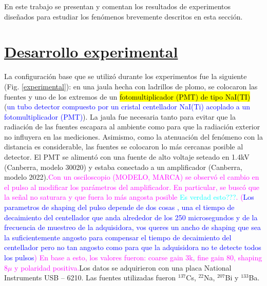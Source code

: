 \documentclass[twoside]{article}
\begin{document}
\begin{multicols}{2}
\fi

En este trabajo se presentan y comentan los resultados de experimentos diseñados para estudiar los fenómenos brevemente descritos en esta sección.


\section*{\underline{Desarrollo experimental}}

La configuración base que se utilizó durante los experimentos fue la siguiente (Fig. \ref{experimental}): en una jaula hecha con ladrillos de plomo, se colocaron las fuentes y uno de los extremos de un \hl{fotomultiplicador (PMT) de tipo NaI(TI)} (\textcolor{Blue}{un tubo detector compuesto por un cristal centellador NaI(Ti) acoplado a un fotomultiplicador (PMT)}). La jaula fue necesaria tanto para evitar que la radiación de las fuentes escapara al ambiente como para que la radiación exterior no influyera en las mediciones. Asimismo, como la atenuación del fenómeno con la distancia es considerable, las fuentes se colocaron lo más cercanas posible al detector. El PMT se alimentó con una fuente de alto voltaje seteado en 1.4kV (Canberra, modelo 30020) y estaba conectado a un amplificador (Canberra, modelo 2022).\textcolor{magenta}{Con un osciloscopio (MODELO, MARCA) se observó el cambio en el pulso al modificar los parámetros del amplificador. En particular, se buscó que la señal no saturara y que fuera lo más angosta posible \textcolor{cyan}{Es verdad esto???}. (\textcolor{Blue}{Los parametros de shaping del pulso depende de dos cosas , una el tiempo de decaimiento del centellador que anda alrededor de los 250 microsegundos y de la frecuencia de muestreo de la adquisidora, vos queres un ancho de shaping que sea la suficientemente angosto para compensar el tiempo de decaimiento del centellador pero no tan angosto como para que la adquisidora no te detecte todos los pulsos}) En base a esto, los valores fueron: coarse gain 3k, fine gain 80, shaping 8$\mu$ y polaridad positiva.}Los datos se adquirieron con una placa National Instruments USB -- 6210. Las fuentes utilizadas fueron $^{137}$Cs, $^{22}$Na, $^{207}$Bi y $^{133}$Ba. 


\end{multicols}
\end{document}
